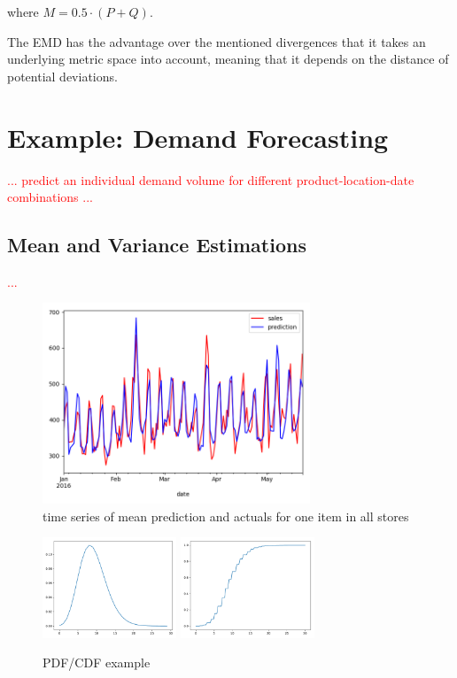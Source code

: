 \documentclass[BCOR=1mm, DIV=calc,10pt,
twoside=true,
twocolumn,
headings=normal]{scrartcl}
\begin{document}
where $M = 0.5  \cdot (P + Q)$.

The EMD has the advantage over the mentioned divergences that it takes an underlying metric space into account, meaning that it depends on the distance of potential deviations.


\section{Example: Demand Forecasting}
\label{sec:example}

\textcolor{red}{... predict an individual demand volume for different product-location-date combinations ...}

\subsection{Mean and Variance Estimations}

\textcolor{red}{...}

\begin{figure}
\begin{center}
\includegraphics[width=8cm]{../figures/mean_prediction}
\caption{\label{fig:mean_prediction} time series of mean prediction and actuals for one item in all stores}
\end{center}
\end{figure}

\begin{figure}
\begin{center}
\includegraphics[width=4cm]{../figures/pdf}
\includegraphics[width=4cm]{../figures/cdf}
\caption{\label{fig:pdf_example} PDF/CDF example}
\end{center}
\end{figure}
\end{document}
